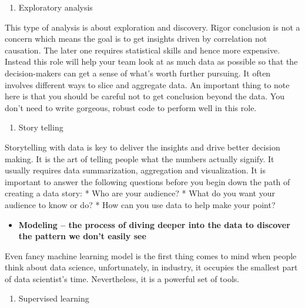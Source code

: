 \documentclass[12pt,]{krantz}
\providecommand{\tightlist}{%
  \setlength{\itemsep}{0pt}\setlength{\parskip}{0pt}}
\begin{document}
\begin{enumerate}
\def\labelenumi{(\arabic{enumi})}
\setcounter{enumi}{1}
\tightlist
\item
  Exploratory analysis
\end{enumerate}

This type of analysis is about exploration and discovery. Rigor conclusion is not a concern which means the goal is to get insights driven by correlation not causation. The later one requires statistical skills and hence more expensive. Instead this role will help your team look at as much data as possible so that the decision-makers can get a sense of what's worth further pursuing. It often involves different ways to slice and aggregate data. An important thing to note here is that you should be careful not to get conclusion beyond the data. You don't need to write gorgeous, robust code to perform well in this role.

\begin{enumerate}
\def\labelenumi{(\arabic{enumi})}
\setcounter{enumi}{2}
\tightlist
\item
  Story telling
\end{enumerate}

Storytelling with data is key to deliver the insights and drive better decision making. It is the art of telling people what the numbers actually signify. It usually requires data summarization, aggregation and visualization. It is important to answer the following questions before you begin down the path of creating a data story:
* Who are your audience?
* What do you want your audience to know or do?
* How can you use data to help make your point?

\begin{itemize}
\tightlist
\item
  \textbf{Modeling -- the process of diving deeper into the data to discover the pattern we don't easily see}
\end{itemize}

Even fancy machine learning model is the first thing comes to mind when people think about data science, unfortunately, in industry, it occupies the smallest part of data scientist's time. Nevertheless, it is a powerful set of tools.

\begin{enumerate}
\def\labelenumi{(\arabic{enumi})}
\tightlist
\item
  Supervised learning
\end{enumerate}
\end{document}
